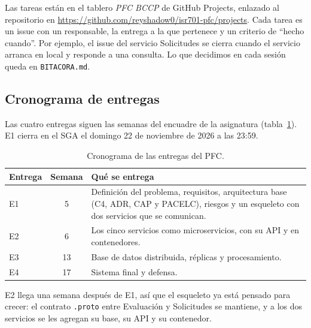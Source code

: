 Las tareas están en el tablero \emph{PFC BCCP} de GitHub Projects, enlazado al repositorio en \url{https://github.com/reyshadow0/isr701-pfc/projects}. Cada tarea es un issue con un responsable, la entrega a la que pertenece y un criterio de ``hecho cuando''. Por ejemplo, el issue del servicio Solicitudes se cierra cuando el servicio arranca en local y responde a una consulta. Lo que decidimos en cada sesión queda en \nolinkurl{BITACORA.md}.

\subsection{Cronograma de entregas}

Las cuatro entregas siguen las semanas del encuadre de la asignatura (tabla~\ref{tab:cronograma}). E1 cierra en el SGA el domingo 22 de noviembre de 2026 a las 23:59.

\begin{table}[htbp]
  \centering
  \caption{Cronograma de las entregas del PFC.}
  \label{tab:cronograma}
  \small
  \begin{tabularx}{\textwidth}{@{}l c >{\raggedright\arraybackslash}X@{}}
    \toprule
    \textbf{Entrega} & \textbf{Semana} & \textbf{Qué se entrega} \\
    \midrule
    E1 & 5 & Definición del problema, requisitos, arquitectura base (C4, ADR, CAP y PACELC), riesgos y un esqueleto con dos servicios que se comunican. \\
    \addlinespace
    E2 & 6 & Los cinco servicios como microservicios, con su API y en contenedores. \\
    \addlinespace
    E3 & 13 & Base de datos distribuida, réplicas y procesamiento. \\
    \addlinespace
    E4 & 17 & Sistema final y defensa. \\
    \bottomrule
  \end{tabularx}
\end{table}

E2 llega una semana después de E1, así que el esqueleto ya está pensado para crecer: el contrato \texttt{.proto} entre Evaluación y Solicitudes se mantiene, y a los dos servicios se les agregan su base, su API y su contenedor.
